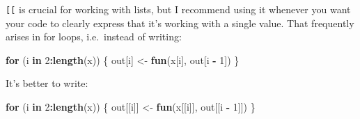 \documentclass[]{book}
\newenvironment{Shaded}{\begin{snugshade}}{\end{snugshade}}
\newcommand{\CommentTok}[1]{\textcolor[rgb]{0.56,0.35,0.01}{\textit{#1}}}
\newcommand{\ControlFlowTok}[1]{\textcolor[rgb]{0.13,0.29,0.53}{\textbf{#1}}}
\newcommand{\DataTypeTok}[1]{\textcolor[rgb]{0.13,0.29,0.53}{#1}}
\newcommand{\DecValTok}[1]{\textcolor[rgb]{0.00,0.00,0.81}{#1}}
\newcommand{\KeywordTok}[1]{\textcolor[rgb]{0.13,0.29,0.53}{\textbf{#1}}}
\newcommand{\NormalTok}[1]{#1}
\newcommand{\OperatorTok}[1]{\textcolor[rgb]{0.81,0.36,0.00}{\textbf{#1}}}
\newcommand{\StringTok}[1]{\textcolor[rgb]{0.31,0.60,0.02}{#1}}
\theoremstyle{definition}
\theoremstyle{definition}
\theoremstyle{definition}
\theoremstyle{remark}
\begin{document}
\begin{Shaded}
\end{Shaded}

\texttt{{[}{[}} is crucial for working with lists, but I recommend using
it whenever you want your code to clearly express that it's working with
a single value. That frequently arises in for loops, i.e.~instead of
writing:

\begin{Shaded}
\begin{Highlighting}[]
\ControlFlowTok{for}\NormalTok{ (i }\ControlFlowTok{in} \DecValTok{2}\OperatorTok{:}\KeywordTok{length}\NormalTok{(x)) \{}
\NormalTok{  out[i] <-}\StringTok{ }\KeywordTok{fun}\NormalTok{(x[i], out[i }\OperatorTok{-}\StringTok{ }\DecValTok{1}\NormalTok{])}
\NormalTok{\}}
\end{Highlighting}
\end{Shaded}

It's better to write:

\begin{Shaded}
\begin{Highlighting}[]
\ControlFlowTok{for}\NormalTok{ (i }\ControlFlowTok{in} \DecValTok{2}\OperatorTok{:}\KeywordTok{length}\NormalTok{(x)) \{}
\NormalTok{  out[[i]] <-}\StringTok{ }\KeywordTok{fun}\NormalTok{(x[[i]], out[[i }\OperatorTok{-}\StringTok{ }\DecValTok{1}\NormalTok{]])}
\NormalTok{\}}
\end{Highlighting}
\end{Shaded}
\end{document}
